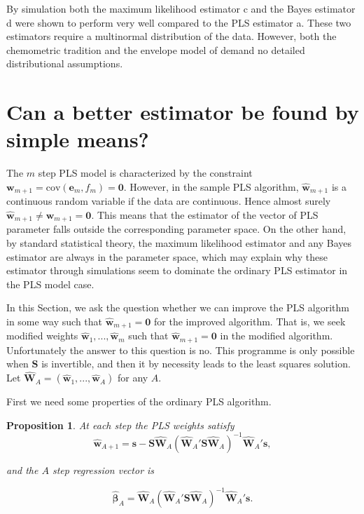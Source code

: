 \documentclass[a4paper, 11pt]{article}
\newtheorem{proposition}{Proposition} \theoremstyle{remark}
\begin{document}
By simulation both the maximum likelihood estimator c and the Bayes estimator d were shown to perform very well compared to the PLS estimator a. These two estimators require a multinormal distribution of the data. However, both the chemometric tradition and the envelope model of \citet{cook2010envelope, cook2013envelopes} demand no detailed distributional assumptions.

\section{Can a better estimator be found by simple means?}

The $m$ step PLS model is characterized by the constraint $\bm{w}_{m+1}=\mathrm{cov}(\bm{e}_m ,f_m)=\bm{0}$. However, in the sample PLS algorithm, $\widehat{\bm{w}}_{m+1}$ is a continuous random variable if the data are continuous. Hence almost surely $\widehat{\bm{w}}_{m+1}\ne\bm{w}_{m+1}=\bm{0}$. This means that the estimator of the vector of PLS parameter falls outside the corresponding parameter space. On the other hand, by standard statistical theory, the maximum likelihood estimator and any Bayes estimator are always in the parameter space, which may explain why these estimator through simulations seem to dominate the ordinary PLS estimator in the PLS model case.

In this Section, we ask the question whether we can improve the PLS algorithm in some way such that $\widehat{\bm{w}}_{m+1}=\bm{0}$ for the improved algorithm. That is, we seek modified weights $\widehat{\bm{w}}_{1},...,\widehat{\bm{w}}_{m}$ such that $\widehat{\bm{w}}_{m+1}=\bm{0}$ in the modified algorithm. Unfortunately the answer to this question is no. This programme is only possible when $\bm{S}$ is invertible, and then it by necessity leads to the least squares solution. Let $\widehat{\bm{W}}_A=(\widehat{\bm{w}}_1,...,\widehat{\bm{w}}_A)$ for any $A$.

First we need some properties of the ordinary PLS algorithm.
\bigskip

\begin{proposition}
  At each step the PLS weights satisfy
  \begin{equation}
    \widehat{\bm{w}}_{A+1} =
    \bm{s}-\bm{S}\widehat{\bm{W}}_{A}
    (\widehat{\bm{W}}_{A}'\bm{S}\widehat{\bm{W}}_{A})^{-1}
    \widehat{\bm{W}}_{A}'\bm{s},
    \label{weight}
  \end{equation}

and the $A$ step regression vector is

\begin{equation}
  \widehat{\bm{\beta}}_{A} =
  \widehat{\bm{W}}_{A}
  (\widehat{\bm{W}}_{A}'\bm{S}\widehat{\bm{W}}_{A})^{-1}
  \widehat{\bm{W}}_{A}'\bm{s}.
  \label{regression}
\end{equation}
\end{proposition}
\end{document}
